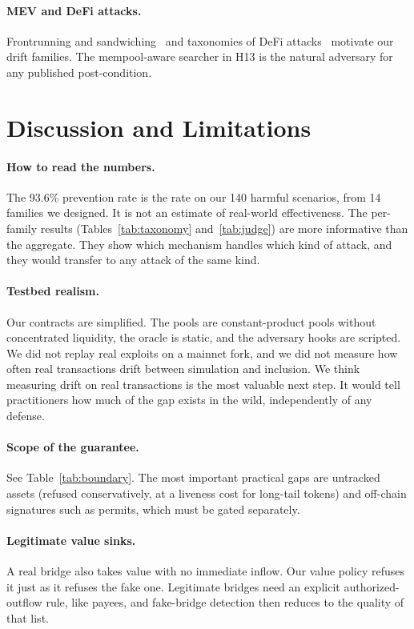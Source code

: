 \documentclass[11pt]{article}
\begin{document}
\paragraph{MEV and DeFi attacks.} Frontrunning and sandwiching~\cite{daian2020flash,qin2022quantifying} and taxonomies of DeFi attacks~\cite{zhou2023sok} motivate our drift families. The mempool-aware searcher in H13 is the natural adversary for any published post-condition.

\section{Discussion and Limitations}
\label{sec:limits}
\paragraph{How to read the numbers.} The 93.6\% prevention rate is the rate on our 140 harmful scenarios, from 14 families we designed. It is not an estimate of real-world effectiveness. The per-family results (Tables~\ref{tab:taxonomy} and~\ref{tab:judge}) are more informative than the aggregate. They show which mechanism handles which kind of attack, and they would transfer to any attack of the same kind.

\paragraph{Testbed realism.} Our contracts are simplified. The pools are constant-product pools without concentrated liquidity, the oracle is static, and the adversary hooks are scripted. We did not replay real exploits on a mainnet fork, and we did not measure how often real transactions drift between simulation and inclusion. We think measuring drift on real transactions is the most valuable next step. It would tell practitioners how much of the gap exists in the wild, independently of any defense.

\paragraph{Scope of the guarantee.} See Table~\ref{tab:boundary}. The most important practical gaps are untracked assets (refused conservatively, at a liveness cost for long-tail tokens) and off-chain signatures such as permits, which must be gated separately.

\paragraph{Legitimate value sinks.} A real bridge also takes value with no immediate inflow. Our value policy refuses it just as it refuses the fake one. Legitimate bridges need an explicit authorized-outflow rule, like payees, and fake-bridge detection then reduces to the quality of that list.
\end{document}
